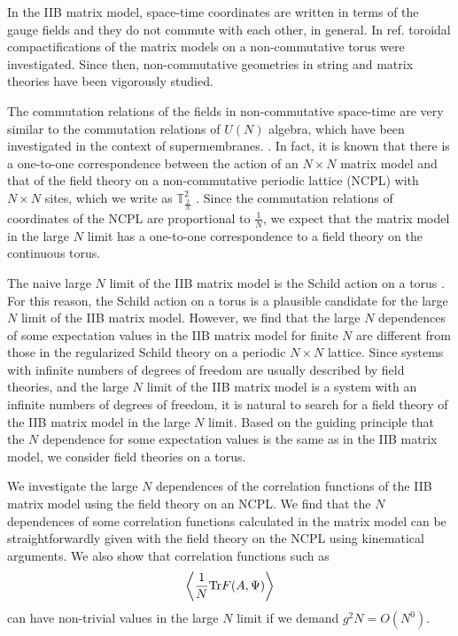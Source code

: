 \documentclass[12pt,a4paper]{article}
\newcommand{\ncpl}{{\mathbb T}^2_\frac{2}{N}}
\newcommand{\Tr}{\mbox{\rm Tr}}
\begin{document}
In the IIB matrix model, space-time coordinates are written in terms
of the gauge fields and they do not commute with each other, in
general.
In ref.\cite{CDS} toroidal compactifications of the matrix models on
a non-commutative torus were investigated. Since then,
non-commutative geometries in string and matrix theories have been
vigorously studied.

The commutation relations of the fields in non-commutative space-time
are very similar to the commutation relations of $U(N)$ algebra, which
have been investigated in the context of supermembranes.
\cite{deWit,poppe,zachos,castro}.
In fact, it is known that there is a one-to-one correspondence between
the action of an $N\times N$ matrix model and that of the field theory
on a non-commutative periodic lattice (NCPL) with $N\times N$ sites,
which we write as $\ncpl$ \cite{bars,tokyou,landi}.
Since the commutation relations of coordinates of the NCPL are
proportional to $\frac{1}{N}$, we expect that the matrix model in
the large $N$ limit has a one-to-one correspondence to a field theory
on the continuous torus.

The naive large $N$ limit of the IIB matrix model is the Schild action
on a torus \cite{Schild}. For this reason, the Schild action on a torus
is a plausible candidate for the large $N$ limit of the IIB matrix
model.
However, we find that the large $N$ dependences of some expectation
values in the IIB matrix model for finite $N$ are different from those
in the regularized Schild theory on a periodic $N\times N$ lattice.
Since systems with infinite numbers of degrees of freedom are usually
described by field theories, and the large $N$ limit of the IIB matrix
model is a system with an infinite numbers of degrees of freedom, it
is natural to search for a field theory of the IIB matrix model in the
large $N$ limit.
Based on the guiding principle that the $N$ dependence for some
expectation values is the same as in the IIB matrix model, we consider
field theories on a torus.

We investigate the large $N$ dependences of the correlation functions
of the IIB matrix model using the field theory on an NCPL.
We find that the $N$ dependences of some correlation functions
calculated in the matrix model can be straightforwardly given with the
field theory on the NCPL using kinematical arguments.
We also show that correlation functions such as
\begin{equation}
	\left\langle\frac{1}{N}\Tr F(A,\Psi)\right\rangle
\end{equation}
can have non-trivial values in the large $N$ limit if we demand
$g^2N=O(N^0)$.
\end{document}
